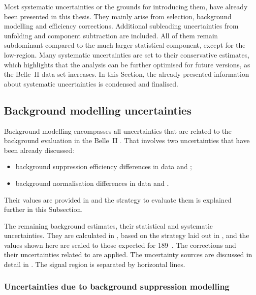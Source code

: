 Most systematic uncertainties or the grounds for introducing them, have already been presented in this thesis.
They mainly arise from selection, background modelling and efficiency corrections.
Additional subleading uncertainties from unfolding and \BtoXdgamma component subtraction are included.
All of them remain subdominant compared to the much larger statistical component, except for the low-\EB region.
Many systematic uncertainties are set to their conservative estimates, 
which highlights that the analysis can be further optimised for future versions, as the Belle~II data set increases.
In this Section, the already presented information about systematic uncertainties is condensed and finalised.

\subsection{Background modelling uncertainties}\label{sec:background_uncertainties}

Background modelling encompasses all uncertainties that are related to the background evaluation in the Belle~II \MC.
That involves two uncertainties that have been already discussed:
\begin{itemize}
    \item background suppression efficiency differences in data and \MC;
    \item background normalisation differences in data and \MC.
\end{itemize}
Their values are provided in  and the strategy to evaluate them is explained further in this Subsection.

\begin{table}[hbtp!]
    \centering
    \caption{\label{tab:background_uncertainties} 
    The remaining \BB background estimates, their statistical and systematic uncertainties.
    They are calculated in \MC, based on the strategy laid out in , 
    and the values shown here are scaled to those expected for 189~\invfb.
    The corrections and their uncertainties related to  are applied.
    The uncertainty sources are discussed in detail in .
    The signal region is separated by horizontal lines.
    }
    
\end{table}

\subsubsection{Uncertainties due to background suppression modelling}\label{sec:correction_systematic}


